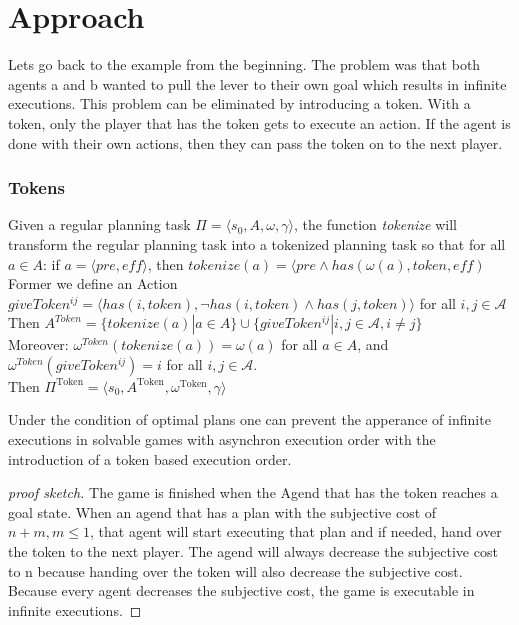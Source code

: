 \chapter{Approach}\label{chap:approach}

Lets go back to the example  from the beginning. The problem was that both agents a and b wanted to pull the lever to their own goal which results in infinite executions. This problem can be eliminated by introducing a token. With a token, only the player that has the token gets to execute an action. If the agent is done with their own actions, then they can pass the token on to the next player.

\subsection{Tokens}

Given a regular planning task $\Pi = \langle s_0, A, \omega, \gamma \rangle $, the function \textit{tokenize} will transform the regular planning task into a tokenized planning task so that for all $a \in A$:
 if $a = \langle pre, \textit{eff} \rangle$, then
   $tokenize(a) =\langle pre \wedge has(\omega(a), token, \textit{eff})$ \\
Former we define an Action
    $ giveToken^{ij} = \langle has(i, token), \neg has(i, token) \wedge has (j, token) \rangle $
    for all $i,j \in \mathcal{A}$ \\
Then $ A^{Token}=\{tokenize(a)|a \in A\} \cup \{giveToken^{ij}|i,j \in \mathcal{A}, i \not = j\}
$ \\
Moreover: $\omega^{Token}(tokenize(a))= \omega(a)$ for all $a \in A$,
and $\omega^{Token}(giveToken^{ij}) = i$ for all $i,j \in \mathcal{A}$. \\
Then $ \Pi^{\text{Token}} = \langle s_0, A ^{\text{Token}}, \omega ^{\text{Token}}, \gamma \rangle $

\begin{theorem}
Under the condition of optimal plans one can prevent the apperance of infinite executions in solvable games with asynchron execution order with the introduction of a token based execution order.
\end{theorem}

\begin{proof}[proof sketch]
  The game is finished when the Agend that has the token reaches a goal state. When an agend that has a plan with the subjective cost of $n+m, m \leq 1$, that agent will start executing that plan and if needed, hand over the token to the next player. The agend will always decrease the subjective cost to n because handing over the token will also decrease the subjective cost. Because every agent decreases the subjective cost, the game is executable in infinite executions.
\end{proof}
















